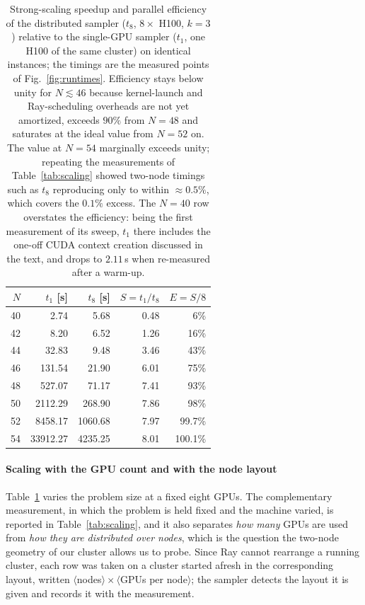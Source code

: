 \documentclass[preprint,12pt,a4paper]{elsarticle}
\begin{document}
\begin{table}[H]
\centering
\begin{tabular}{|r|r|r|r|r|}
\hline
$N$ & $t_1$ [s] & $t_8$ [s] & $S=t_1/t_8$ & $E=S/8$ \\
\hline
40 & 2.74      & 5.68     & 0.48 & 6\% \\
42 & 8.20      & 6.52     & 1.26 & 16\% \\
44 & 32.83     & 9.48     & 3.46 & 43\% \\
46 & 131.54    & 21.90    & 6.01 & 75\% \\
48 & 527.07    & 71.17    & 7.41 & 93\% \\
50 & 2112.29   & 268.90   & 7.86 & 98\% \\
52 & 8458.17   & 1060.68  & 7.97 & 99.7\% \\
54 & 33912.27  & 4235.25  & 8.01 & 100.1\% \\
\hline
\end{tabular}
\caption{Strong-scaling speedup and parallel efficiency of the distributed
sampler ($t_8$, $8\times$ H100, $k=3$) relative to the single-GPU sampler
($t_1$, one H100 of the same cluster) on identical instances; the timings are the
measured points of Fig.~\ref{fig:runtimes}. Efficiency stays below unity for
$N \lesssim 46$ because kernel-launch and Ray-scheduling overheads are not yet
amortized, exceeds $90\%$ from $N=48$ and saturates at the ideal value from
$N=52$ on. The value at $N=54$ marginally exceeds unity; repeating the measurements of
Table~\ref{tab:scaling} showed two-node timings such as $t_8$ reproducing only to within
$\approx\!0.5\%$, which covers the $0.1\%$ excess. The $N=40$ row overstates the efficiency:
being the first measurement of its sweep, $t_1$ there includes the one-off CUDA
context creation discussed in the text, and drops to $2.11$\,s when re-measured
after a warm-up.}
\label{tab:efficiency}
\end{table}

\paragraph{Scaling with the GPU count and with the node layout}
Table~\ref{tab:efficiency} varies the problem size at a fixed eight GPUs. The complementary
measurement, in which the problem is held fixed and the machine varied, is reported in
Table~\ref{tab:scaling}, and it also separates \emph{how many} GPUs are used from \emph{how
they are distributed over nodes}, which is the question the two-node geometry of our cluster
allows us to probe. Since Ray cannot rearrange a running cluster, each row was taken on a
cluster started afresh in the corresponding layout, written $\langle$nodes$\rangle\times
\langle$GPUs per node$\rangle$; the sampler detects the layout it is given and records it with
the measurement.
\end{document}
